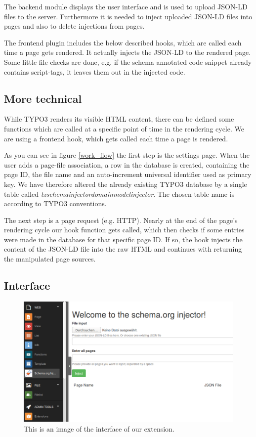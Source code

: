 \documentclass[12pt]{article}
\begin{document}
The backend module displays the user interface and is used to upload JSON-LD files to the server.
Furthermore it is needed to inject uploaded JSON-LD files into pages and also to delete injections from pages.

The frontend plugin includes the below described hooks, which are called each time a page gets rendered. It actually injects the JSON-LD to the rendered page.
Some little file checks are done, e.g. if the schema annotated code snippet already contains script-tags, it leaves them out in the injected code.

\subsection{More technical}

While TYPO3 renders its visible HTML content, there can be defined some functions which are called at a specific point of time in the rendering cycle. 
We are using a frontend hook, which gets called each time a page is rendered.

As you can see in figure \ref{work_flow} the first step is the settings page. When the user adds a page-file association, a row in the database is created, containing the page ID, the file name and an auto-increment universal identifier used as primary key. We have therefore altered the already existing TYPO3 database by a single table called \emph{tx\textunderscore schemainjector\textunderscore domain\textunderscore model\textunderscore injector}. The chosen table name is according to TYPO3 conventions.

The next step is a page request (e.g. HTTP). Nearly at the end of the page's rendering cycle our hook function gets called, which then checks if some entries were made in the database for that specific page ID. If so, the hook injects the content of the JSON-LD file into the raw HTML and continues with returning the manipulated page sources.

\subsection{Interface}
\begin{figure}[ht]
	\centering
	\includegraphics[width=1.0\textwidth]{backend_module.png}
	\caption{This is an image of the interface of our extension.}
	\label{interface}
\end{figure}
\end{document}
